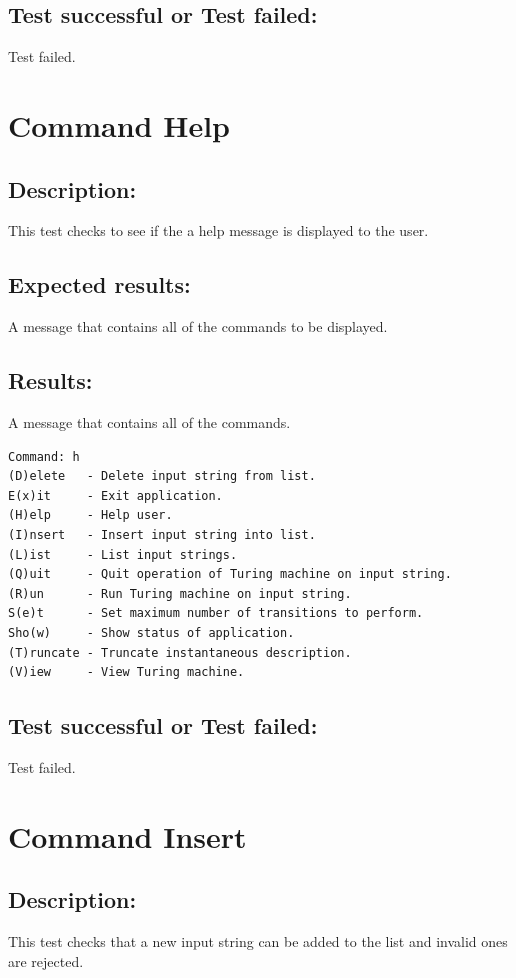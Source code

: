 \documentclass{report}
\begin{document}
\section{Test successful or Test failed:} Test failed.
\pagebreak




\chapter{Command Help}
\section{Description:} This test checks to see if the a help message is displayed to the user.
\section{Expected results:} A message that contains all of the commands to be displayed.

\section{Results:} A message that contains all of the commands.
\begin{verbatim}
Command: h
(D)elete   - Delete input string from list.
E(x)it     - Exit application.
(H)elp     - Help user.
(I)nsert   - Insert input string into list.
(L)ist     - List input strings.
(Q)uit     - Quit operation of Turing machine on input string.
(R)un      - Run Turing machine on input string.
S(e)t      - Set maximum number of transitions to perform.
Sho(w)     - Show status of application.
(T)runcate - Truncate instantaneous description.
(V)iew     - View Turing machine.
\end{verbatim}
\section{Test successful or Test failed:} Test failed.
\pagebreak



\chapter{Command Insert}
\section{Description:} This test checks that a new input string can be added to the list and invalid ones are rejected.
\end{document}
